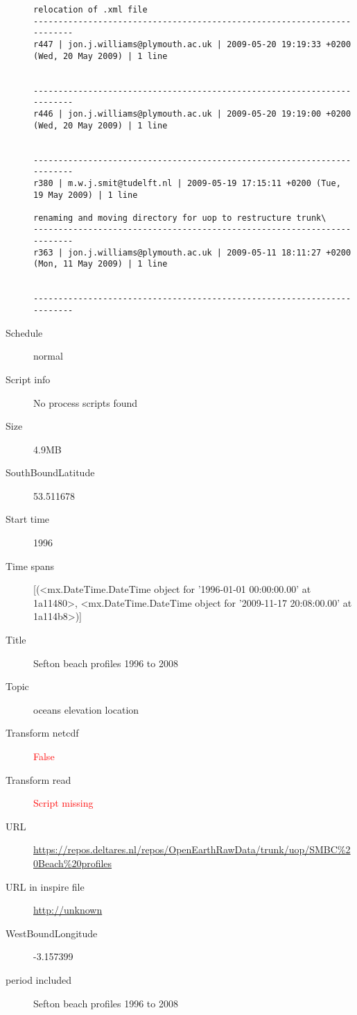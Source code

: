 \documentclass[9]{report}
\begin{document}
\begin{description}
\begin{verbatim}
relocation of .xml file
------------------------------------------------------------------------
r447 | jon.j.williams@plymouth.ac.uk | 2009-05-20 19:19:33 +0200 (Wed, 20 May 2009) | 1 line


------------------------------------------------------------------------
r446 | jon.j.williams@plymouth.ac.uk | 2009-05-20 19:19:00 +0200 (Wed, 20 May 2009) | 1 line


------------------------------------------------------------------------
r380 | m.w.j.smit@tudelft.nl | 2009-05-19 17:15:11 +0200 (Tue, 19 May 2009) | 1 line

renaming and moving directory for uop to restructure trunk\
------------------------------------------------------------------------
r363 | jon.j.williams@plymouth.ac.uk | 2009-05-11 18:11:27 +0200 (Mon, 11 May 2009) | 1 line


------------------------------------------------------------------------

\end{verbatim}
  \item[Schedule] normal
  \item[Script info] No process scripts found
  \item[Size] 4.9MB
  \item[SouthBoundLatitude] 53.511678
  \item[Start time] 1996
  \item[Time spans] [(<mx.DateTime.DateTime object for '1996-01-01 00:00:00.00' at 1a11480>, <mx.DateTime.DateTime object for '2009-11-17 20:08:00.00' at 1a114b8>)]
  \item[Title]  Sefton beach profiles 1996 to 2008 
  \item[Topic] oceans elevation location
  \item[Transform netcdf] \textcolor{red}{False}
  \item[Transform read] \textcolor{red}{Script missing}
  \item[URL] \href{https://repos.deltares.nl/repos/OpenEarthRawData/trunk/uop/SMBC\%20Beach\%20profiles}{https://repos.deltares.nl/repos/OpenEarthRawData/trunk/uop/SMBC\%20Beach\%20profiles}
  \item[URL in inspire file] \href{http://unknown}{http://unknown}
  \item[WestBoundLongitude] -3.157399
  \item[period included] Sefton beach profiles 1996 to 2008
\end{description}
\end{document}
